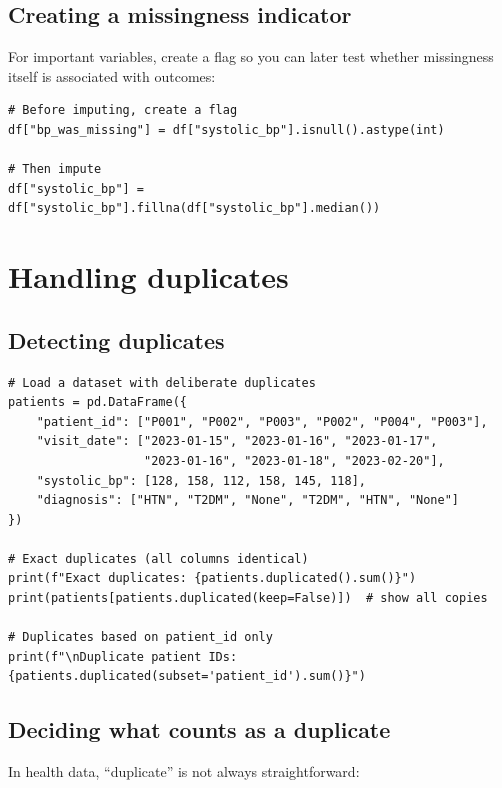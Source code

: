 \subsection{Creating a missingness indicator}

For important variables, create a flag so you can later test whether missingness itself is associated with outcomes:

\begin{verbatim}
# Before imputing, create a flag
df["bp_was_missing"] = df["systolic_bp"].isnull().astype(int)

# Then impute
df["systolic_bp"] = df["systolic_bp"].fillna(df["systolic_bp"].median())
\end{verbatim}

\section{Handling duplicates}

\subsection{Detecting duplicates}

\begin{verbatim}
# Load a dataset with deliberate duplicates
patients = pd.DataFrame({
    "patient_id": ["P001", "P002", "P003", "P002", "P004", "P003"],
    "visit_date": ["2023-01-15", "2023-01-16", "2023-01-17",
                   "2023-01-16", "2023-01-18", "2023-02-20"],
    "systolic_bp": [128, 158, 112, 158, 145, 118],
    "diagnosis": ["HTN", "T2DM", "None", "T2DM", "HTN", "None"]
})

# Exact duplicates (all columns identical)
print(f"Exact duplicates: {patients.duplicated().sum()}")
print(patients[patients.duplicated(keep=False)])  # show all copies

# Duplicates based on patient_id only
print(f"\nDuplicate patient IDs: {patients.duplicated(subset='patient_id').sum()}")
\end{verbatim}

\subsection{Deciding what counts as a duplicate}

In health data, ``duplicate'' is not always straightforward:

